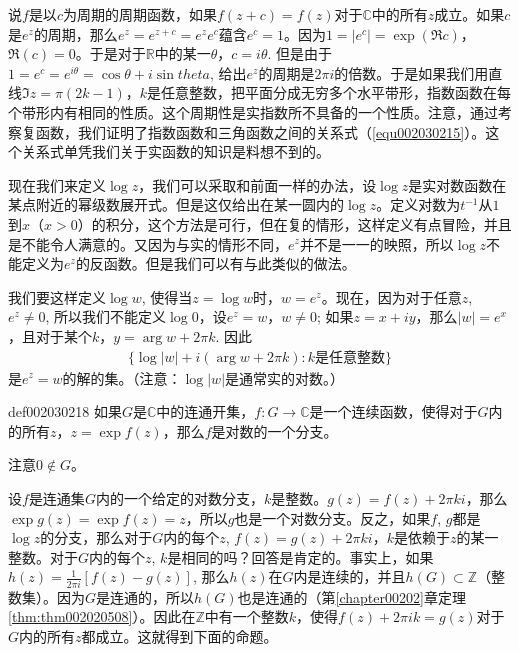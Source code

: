 说$f$是以$c$为周期的周期函数，如果$f(z+c) = f(z)$对于$\mathbb{C}$中的所有$z$成立。如果$c$是$e^z$的周期，那么$e^z = e^{z+c} = e^ze^c$蕴含$e^c=1$。因为$1 = |e^c| = \exp{(\Re{c})}$，$\Re{(c)} = 0$。于是对于$\mathbb{R}$中的某一$\theta$，$c = i\theta$. 但是由于$1 = e^c = e^{i\theta} = \cos{\theta} + i\sin{theta}$, 给出$e^z$的周期是$2\pi{i}$的倍数。于是如果我们用直线$\Im{z} = \pi(2k-1)$，$k$是任意整数，把平面分成无穷多个水平带形，指数函数在每个带形内有相同的性质。这个周期性是实指数所不具备的一个性质。注意，通过考察复函数，我们证明了指数函数和三角函数之间的关系式（\ref{equ002030215}）。这个关系式单凭我们关于实函数的知识是料想不到的。

现在我们来定义$\log{z}$，我们可以采取和前面一样的办法，设$\log{z}$是实对数函数在某点附近的幂级数展开式。但是这仅给出在某一圆内的$\log{z}$。定义对数为$t^{-1}$从$1$到$x$（$x > 0$）的积分，这个方法是可行，但在复的情形，这样定义有点冒险，并且是不能令人满意的。又因为与实的情形不同，$e^z$并不是一一的映照，所以$\log{z}$不能定义为$e^z$的反函数。但是我们可以有与此类似的做法。

我们要这样定义$\log{w}$, 使得当$z = \log{w}$时，$w = e^z$。现在，因为对于任意$z$, $e^z \neq 0$, 所以我们不能定义$\log{0}$，设$e^z = w$，$w \neq 0$; 如果$z = x + iy$，那么$|w| = e^x$，且对于某个$k$，$y = \arg{w} + 2\pi{}k$. 因此
\begin{gather}\label{equ002030217}
\{\log{|w|} + i(\arg{w} + 2\pi{}k) : k\text{是任意整数}\}
\end{gather}
是$e^z = w$的解的集。（注意：$\log{|w|}$是通常实的对数。）

\begin{definition}{}{def002030218}
如果$G$是$\mathbb{C}$中的连通开集，$f: G \to \mathbb{C}$是一个连续函数，使得对于$G$内的所有$z$，$z = \exp{f(z)}$，那么$f$是对数的一个分支。
\end{definition}

注意$0 \not\in G$。

设$f$是连通集$G$内的一个给定的对数分支，$k$是整数。$g(z)=f(z) + 2\pi{}ki$，那么$\exp{g(z)} = \exp{f(z)} = z$，所以$g$也是一个对数分支。反之，如果$f$, $g$都是$\log{z}$的分支，那么对于$G$内的每个$z$, $f(z) = g(z) + 2\pi{}ki$，$k$是依赖于$z$的某一整数。对于$G$内的每个$z$, $k$是相同的吗？回答是肯定的。事实上，如果$h(z) = \frac{1}{2\pi{}i}[f(z)-g(z)]$, 那么$h(z)$在$G$内是连续的，并且$h(G) \subset \mathbb{Z}$（整数集）。因为$G$是连通的，所以$h(G)$也是连通的（第\ref{chapter00202}章定理\ref{thm:thm002020508}）。因此在$\mathbb{Z}$中有一个整数$k$，使得$f(z) + 2\pi{}ik = g(z)$对于$G$内的所有$z$都成立。这就得到下面的命题。

